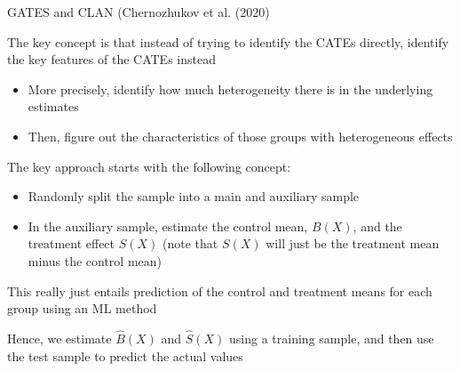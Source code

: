 \documentclass[notes,11pt, aspectratio=169]{beamer}
\newenvironment{wideitemize}{\itemize\addtolength{\itemsep}{10pt}}{\enditemize}
\begin{document}
\begin{frame}{GATES and CLAN  (Chernozhukov et al. (2020)}
  \begin{wideitemize}
  \item The key concept is that instead of trying to identify the
    CATEs directly, identify the key features of the CATEs instead
    \begin{itemize}
    \item More precisely, identify how much heterogeneity there is in
      the underlying estimates
    \item Then, figure out the characteristics of those groups with
      heterogeneous effects
    \end{itemize}
  \item The key approach starts with the following concept:
    \begin{itemize}
    \item Randomly split the sample into a main and auxiliary sample
    \item In the auxiliary sample, estimate the control mean, $B(X)$,
      and the treatment effect $S(X)$ (note that $S(X)$ will just be
      the treatment mean minus the control mean)
    \end{itemize}      
  \item This really just entails prediction of the control and
    treatment means for each group using an ML method
  \item Hence, we estimate $\hat{B}(X)$ and $\hat{S}(X)$ using a
    training sample, and then use the test sample to predict the
    actual values
  \end{wideitemize}
\end{frame}
\end{document}
